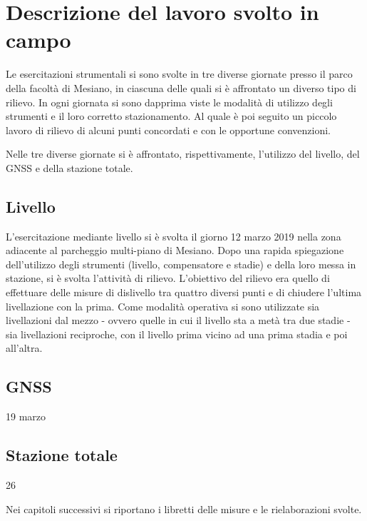 \chapter{Descrizione del lavoro svolto in campo}
Le esercitazioni strumentali si sono svolte in tre diverse giornate presso il  parco della facoltà di Mesiano, in ciascuna delle quali si è affrontato un diverso tipo di rilievo.
In ogni giornata si sono dapprima viste le modalità di utilizzo degli strumenti e il loro corretto stazionamento.
Al quale è poi seguito un piccolo lavoro di rilievo di alcuni punti concordati e con le opportune convenzioni.

Nelle tre diverse giornate si è affrontato, rispettivamente, l'utilizzo del livello, del GNSS e della stazione totale.

\section{Livello}
L'esercitazione mediante livello si è svolta il giorno 12 marzo 2019 nella zona adiacente al parcheggio multi-piano di Mesiano.
Dopo una rapida spiegazione dell'utilizzo degli strumenti (livello, compensatore e stadie) e della loro messa in stazione, si è svolta l'attività di rilievo. 
L'obiettivo del rilievo era quello di effettuare delle misure di dislivello tra quattro diversi punti e di chiudere l'ultima livellazione con la prima. 
Come modalità operativa si sono utilizzate sia livellazioni dal mezzo - ovvero quelle in cui il livello sta a metà tra due stadie - sia livellazioni reciproche, con il livello prima vicino ad una prima stadia e poi all'altra.  
\section{GNSS}
19 marzo
\section{Stazione totale}
26 

Nei capitoli successivi si riportano i libretti delle misure e le rielaborazioni svolte.